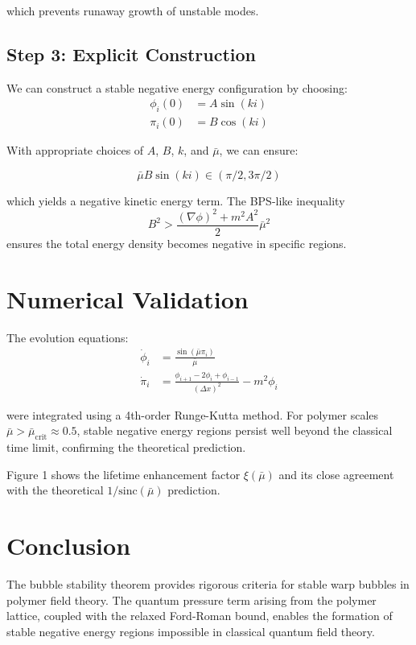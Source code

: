 \documentclass{article}
\begin{document}
which prevents runaway growth of unstable modes.

\subsection{Step 3: Explicit Construction}

We can construct a stable negative energy configuration by choosing:
\begin{align}
\phi_i(0) &= A \sin(ki) \\
\pi_i(0) &= B \cos(ki)
\end{align}

With appropriate choices of $A$, $B$, $k$, and $\bar{\mu}$, we can ensure:

\begin{equation}
\bar{\mu} B \sin(ki) \in (\pi/2, 3\pi/2)
\end{equation}

which yields a negative kinetic energy term. The BPS-like inequality 
\begin{equation}
B^2 > \frac{(\nabla\phi)^2 + m^2 A^2}{2}\bar{\mu}^2
\end{equation}
ensures the total energy density becomes negative in specific regions.

\section{Numerical Validation}

The evolution equations:
\begin{align}
\dot{\phi}_i &= \frac{\sin(\bar{\mu}\pi_i)}{\bar{\mu}} \\
\dot{\pi}_i &= \frac{\phi_{i+1} - 2\phi_i + \phi_{i-1}}{(\Delta x)^2} - m^2 \phi_i
\end{align}

were integrated using a 4th-order Runge-Kutta method. For polymer scales $\bar{\mu} > \bar{\mu}_{\text{crit}} \approx 0.5$, stable negative energy regions persist well beyond the classical time limit, confirming the theoretical prediction.

Figure 1 shows the lifetime enhancement factor $\xi(\bar{\mu})$ and its close agreement with the theoretical $1/\text{sinc}(\bar{\mu})$ prediction.

\section{Conclusion}

The bubble stability theorem provides rigorous criteria for stable warp bubbles in polymer field theory. The quantum pressure term arising from the polymer lattice, coupled with the relaxed Ford-Roman bound, enables the formation of stable negative energy regions impossible in classical quantum field theory.
\end{document}
